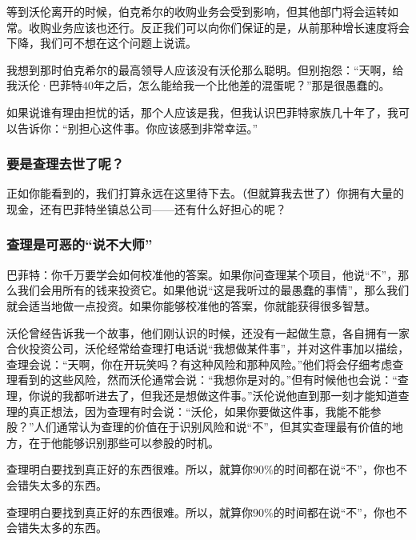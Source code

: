 等到沃伦离开的时候，伯克希尔的收购业务会受到影响，但其他部门将会运转如常。收购业务应该也还行。反正我们可以向你们保证的是，从前那种增长速度将会下降，我们可不想在这个问题上说谎。
\par

我想到那时伯克希尔的最高领导人应该没有沃伦那么聪明。但别抱怨：“天啊，给我沃伦·巴菲特40年之后，怎么能给我一个比他差的混蛋呢？”那是很愚蠢的。
\par

如果说谁有理由担忧的话，那个人应该是我，但我认识巴菲特家族几十年了，我可以告诉你：“别担心这件事。你应该感到非常幸运。”
\par

\subsubsection*{要是查理去世了呢？}

正如你能看到的，我们打算永远在这里待下去。（但就算我去世了）你拥有大量的现金，还有巴菲特坐镇总公司——还有什么好担心的呢？
\par

\subsubsection*{查理是可恶的“说不大师”}

巴菲特：你千万要学会如何校准他的答案。如果你问查理某个项目，他说“不”，那么我们会用所有的钱来投资它。如果他说“这是我听过的最愚蠢的事情”，那么我们就会适当地做一点投资。如果你能够校准他的答案，你就能获得很多智慧。
\par

沃伦曾经告诉我一个故事，他们刚认识的时候，还没有一起做生意，各自拥有一家合伙投资公司，沃伦经常给查理打电话说“我想做某件事”，并对这件事加以描绘，查理会说：“天啊，你在开玩笑吗？有这种风险和那种风险。”他们将会仔细考虑查理看到的这些风险，然而沃伦通常会说：“我想你是对的。”但有时候他也会说：“查理，你说的我都听进去了，但我还是想做这件事。”沃伦说他直到那一刻才能知道查理的真正想法，因为查理有时会说：“沃伦，如果你要做这件事，我能不能参股？”人们通常认为查理的价值在于识别风险和说“不”，但其实查理最有价值的地方，在于他能够识别那些可以参股的时机。
\par

查理明白要找到真正好的东西很难。所以，就算你90\%的时间都在说“不”，你也不会错失太多的东西。
\par

\begin{WisdomBox}
\par

查理明白要找到真正好的东西很难。所以，就算你90\%的时间都在说“不”，你也不会错失太多的东西。
\par
\end{WisdomBox}

